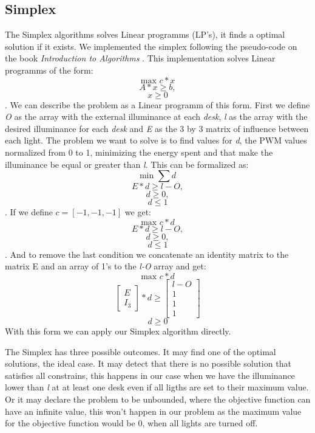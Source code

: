 \subsection{Simplex}
\label{sec:Simplex}

The Simplex algorithms solves Linear programms (LP's), it finds a optimal solution if it exists.
We implemented the simplex following the pseudo-code on the book \emph{Introduction to Algorithms} \cite{Cormen}.
This implementation solves Linear programms of the form:
$$ \text{max }c*x $$
$$    A*x \geq b, $$
$$    x \geq 0 $$.
We can describe the problem as a Linear programm of this form. First we define \emph{O} as the array with the external illuminance at each \emph{desk}, \emph{l} as the array with the desired illuminance for each \emph{desk} and \emph{E} as the  3 by 3 matrix of influence between each light.
The problem we want to solve is to find values for \emph{d}, the PWM values normalized from 0 to 1,  minimizing the energy spent and that make the illuminance be equal or greater than \emph{l}.
This can be formalized as:
$$ \text{min }\sum{d} $$
$$    E*d \geq l-O, $$
$$    d \geq 0, $$
$$    d \leq 1 $$.
If we define  $c = [-1, -1, -1]$ we get:
$$ \text{max }c*d $$
$$    E*d \geq l-O, $$
$$    d \geq 0, $$
$$    d \leq 1 $$.
And to remove the last condition we concatenate an identity matrix to the matrix E and an array of 1's to the \emph{l-O} array and get:
$$ \text{max }c*d $$
$$
\begin{bmatrix}
    E \\ I_3%
\end{bmatrix}
*d \geq
\begin{bmatrix}
    l-O \\ 1 \\ 1 \\ 1
\end{bmatrix}
$$
$$    d \geq 0 $$
With this form we can apply our Simplex algorithm directly.

The Simplex has three possible outcomes.
It may find one of the optimal solutions, the ideal case.
It may detect that there is no possible solution that satisfies all constrains, this happens in our case when we have the illuminance lower than \emph{l} at at least one desk even if all ligths are set to their maximum value.
Or it may declare the problem to be unbounded, where the objective function can have an infinite value, this won't happen in our problem as the maximum value for the objective function would be 0, when all lights are turned off.

